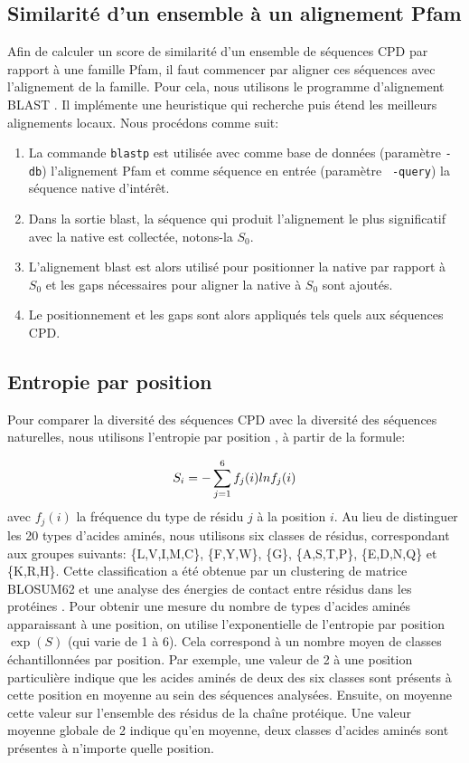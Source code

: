 \subsection{Similarité d'un ensemble à un alignement Pfam}
\label{SimPfam}
Afin de calculer un score de similarité d'un ensemble de séquences CPD par rapport à une famille Pfam, il faut commencer par aligner ces séquences avec l'alignement de la famille. Pour cela, nous utilisons le programme d'alignement BLAST \cite{Altschul97,Camacho08}. Il implémente une heuristique qui recherche puis étend les meilleurs alignements locaux. Nous procédons comme suit:
\begin{enumerate}[leftmargin=*]
\item La commande \verb!blastp! est utilisée avec comme base de données (paramètre \verb!-db!) l'alignement Pfam et comme séquence en entrée (paramètre \verb! -query!) la séquence native d'intérêt. 
\item Dans la sortie blast, la séquence qui produit l'alignement le plus significatif avec la native est collectée, notons-la $S_0$. 
\item L'alignement blast est alors utilisé pour positionner la native par rapport à $S_0$ et les gaps nécessaires pour aligner la native à $S_0$ sont ajoutés.
\item Le positionnement et les gaps sont alors appliqués tels quels aux séquences CPD.

\end{enumerate}

\subsection{Entropie par position}
\label{sec:Entropie}
Pour comparer la diversité des séquences CPD avec la diversité des séquences naturelles, nous utilisons l'entropie par position \cite{DurbinBK}, à partir de la formule:

\begin{equation} \label{eq:entropy}
  S_i = - \sum_{j=1}^6 f_j(i)lnf_j(i) \\
\end{equation} 
avec $f_j(i)$ la fréquence du type de résidu $j$ à la position $i$. Au lieu de distinguer les 20 types d'acides aminés, nous utilisons six classes de résidus, correspondant aux groupes suivants: \{L,V,I,M,C\}, \{F,Y,W\}, \{G\}, \{A,S,T,P\}, \{E,D,N,Q\} et \{K,R,H\}. Cette classification a été obtenue par un clustering de matrice BLOSUM62 et une analyse  des énergies de contact entre résidus dans les protéines \cite{Launay07}. Pour obtenir une mesure du nombre de types d'acides aminés apparaissant à une position, on utilise l'exponentielle de l'entropie par position $\exp(S)$ (qui varie de 1 à 6).  Cela correspond à un nombre moyen de classes échantillonnées par position. Par exemple, une valeur de 2 à une position particulière indique que les acides aminés de deux des six classes sont présents à cette position en moyenne au sein des séquences analysées. Ensuite, on moyenne cette valeur sur l'ensemble des résidus de la chaîne protéique. Une valeur moyenne globale de 2 indique qu'en moyenne, deux classes d'acides aminés sont présentes à n'importe quelle position.


\clearpage


